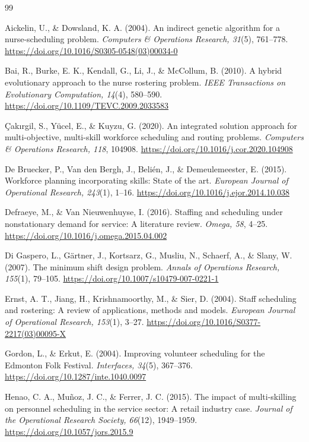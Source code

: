 \documentclass[12pt]{article}
\begin{document}
\renewcommand{\refname}{References}
\begin{thebibliography}{99}

Aickelin, U., \& Dowsland, K. A. (2004).
An indirect genetic algorithm for a nurse-scheduling problem.
\textit{Computers \& Operations Research, 31}(5), 761--778.
\url{https://doi.org/10.1016/S0305-0548(03)00034-0}

Bai, R., Burke, E. K., Kendall, G., Li, J., \& McCollum, B. (2010).
A hybrid evolutionary approach to the nurse rostering problem.
\textit{IEEE Transactions on Evolutionary Computation, 14}(4), 580--590.
\url{https://doi.org/10.1109/TEVC.2009.2033583}

\c{C}ak{\i}rgil, S., Y\"ucel, E., \& Kuyzu, G. (2020).
An integrated solution approach for multi-objective, multi-skill workforce scheduling and routing problems.
\textit{Computers \& Operations Research, 118}, 104908.
\url{https://doi.org/10.1016/j.cor.2020.104908}

De Bruecker, P., Van den Bergh, J., Beli\'en, J., \& Demeulemeester, E. (2015).
Workforce planning incorporating skills: State of the art.
\textit{European Journal of Operational Research, 243}(1), 1--16.
\url{https://doi.org/10.1016/j.ejor.2014.10.038}

Defraeye, M., \& Van Nieuwenhuyse, I. (2016).
Staffing and scheduling under nonstationary demand for service: A literature review.
\textit{Omega, 58}, 4--25.
\url{https://doi.org/10.1016/j.omega.2015.04.002}

Di Gaspero, L., G\"artner, J., Kortsarz, G., Musliu, N., Schaerf, A., \& Slany, W. (2007).
The minimum shift design problem.
\textit{Annals of Operations Research, 155}(1), 79--105.
\url{https://doi.org/10.1007/s10479-007-0221-1}

Ernst, A. T., Jiang, H., Krishnamoorthy, M., \& Sier, D. (2004).
Staff scheduling and rostering: A review of applications, methods and models.
\textit{European Journal of Operational Research, 153}(1), 3--27.
\url{https://doi.org/10.1016/S0377-2217(03)00095-X}

Gordon, L., \& Erkut, E. (2004).
Improving volunteer scheduling for the Edmonton Folk Festival.
\textit{Interfaces, 34}(5), 367--376.
\url{https://doi.org/10.1287/inte.1040.0097}

Henao, C. A., Mu\~noz, J. C., \& Ferrer, J. C. (2015).
The impact of multi-skilling on personnel scheduling in the service sector: A retail industry case.
\textit{Journal of the Operational Research Society, 66}(12), 1949--1959.
\url{https://doi.org/10.1057/jors.2015.9}


\end{thebibliography}
\end{document}
